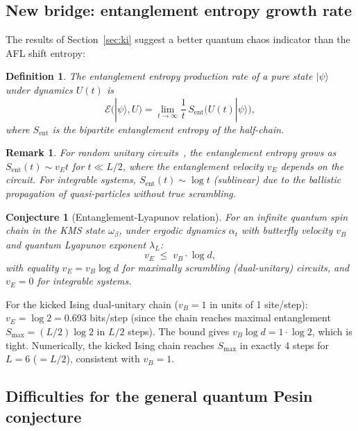 \documentclass[12pt,a4paper]{article}
\newtheorem{definition}[theorem]{Definition}
\newtheorem{remark}[theorem]{Remark}
\newtheorem{conjecture}[theorem]{Conjecture}
\begin{document}
\subsection{New bridge: entanglement entropy growth rate}

The results of Section~\ref{sec:ki} suggest a better quantum chaos indicator than the
AFL shift entropy:

\begin{definition}
  The \emph{entanglement entropy production rate} of a pure state $|\psi\rangle$ under
  dynamics $U(t)$ is
  \[
    \mathcal{E}(|\psi\rangle, U) = \lim_{t \to \infty} \frac{1}{t}\, S_{\mathrm{ent}}\!\bigl(U(t)|\psi\rangle\bigr),
  \]
  where $S_{\mathrm{ent}}$ is the bipartite entanglement entropy of the half-chain.
\end{definition}

\begin{remark}
  For random unitary circuits~\cite{nahum2017}, the entanglement entropy grows as
  $S_{\mathrm{ent}}(t) \sim v_E t$ for $t \ll L/2$, where the
  \emph{entanglement velocity} $v_E$ depends on the circuit.  For integrable systems,
  $S_{\mathrm{ent}}(t) \sim \log t$ (sublinear) due to the ballistic propagation of
  quasi-particles without true scrambling.
\end{remark}

\begin{conjecture}[Entanglement-Lyapunov relation]
  \label{conj:ent_lyapunov}
  For an infinite quantum spin chain in the KMS state $\omega_\beta$, under ergodic
  dynamics $\alpha_t$ with butterfly velocity $v_B$ and quantum Lyapunov exponent
  $\lambda_L$:
  \[
    v_E \;\leq\; v_B \cdot \log d,
  \]
  with equality $v_E = v_B \log d$ for maximally scrambling (dual-unitary) circuits,
  and $v_E = 0$ for integrable systems.
\end{conjecture}

For the kicked Ising dual-unitary chain ($v_B = 1$ in units of 1 site/step):
$v_E = \log 2 = 0.693$ bits/step (since the chain reaches maximal entanglement
$S_{\max} = (L/2) \log 2$ in $L/2$ steps).  The bound gives $v_B \log d = 1 \cdot \log 2$,
which is tight.  Numerically, the kicked Ising chain reaches $S_{\max}$ in exactly 4
steps for $L = 6$ ($= L/2$), consistent with $v_B = 1$.

\subsection{Difficulties for the general quantum Pesin conjecture}
\end{document}
